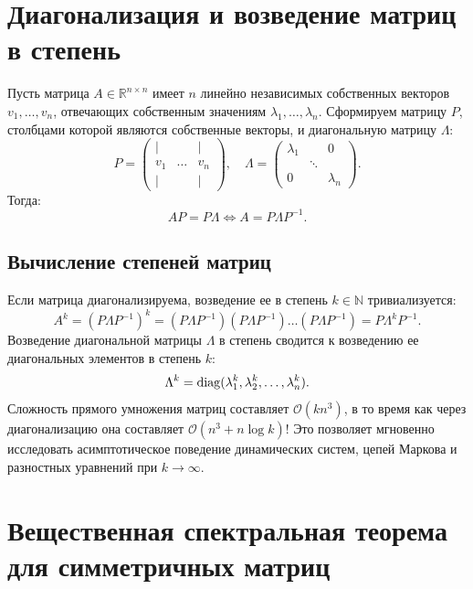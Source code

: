     \section{Диагонализация и возведение матриц в степень}

    \begin{theorem}
Пусть матрица $A \in \mathbb{R}^{n \times n}$ имеет $n$ линейно независимых собственных векторов $v_1, \dots, v_n$,
отвечающих собственным значениям $\lambda_1, \dots, \lambda_n$.
Сформируем матрицу $P$, столбцами которой являются собственные векторы, и диагональную матрицу $\Lambda$:
\[
    P = \begin{pmatrix}
            | & & | \\ v_1 & \dots & v_n \\ | & & |
    \end{pmatrix}, \quad \Lambda = \begin{pmatrix}
                                       \lambda_1 & &
                                       0 \\ & \ddots & \\ 0 & & \lambda_n
    \end{pmatrix}.
\]
Тогда:
\[ A P = P \Lambda \iff A = P \Lambda P^{-1}. \]
    \end{theorem}

    \subsection{Вычисление степеней матриц}
    Если матрица диагонализируема, возведение ее в степень $k \in \mathbb{N}$ тривиализуется:
    \[ A^k=(P \Lambda P^{-1})^k = (P \Lambda P^{-1})(P \Lambda P^{-1}) \dots (P \Lambda P^{-1}) = P \Lambda^k P^{-1}. \]
    Возведение диагональной матрицы $\Lambda$ в степень сводится к возведению ее диагональных элементов в степень $k$:
    \[ \Lambda^k = \operatorname{diag}(\lambda_1^k, \lambda_2^k, \dots, \lambda_n^k). \]
    Сложность прямого умножения матриц составляет $\mathcal{O}(k n^3)$, в то время как через диагонализацию она
    составляет $\mathcal{O}(n^3 + n \log k)$!
    Это позволяет мгновенно исследовать асимптотическое поведение динамических систем, цепей Маркова и разностных
    уравнений при $k \to \infty$.

    \section{Вещественная спектральная теорема для симметричных матриц}

